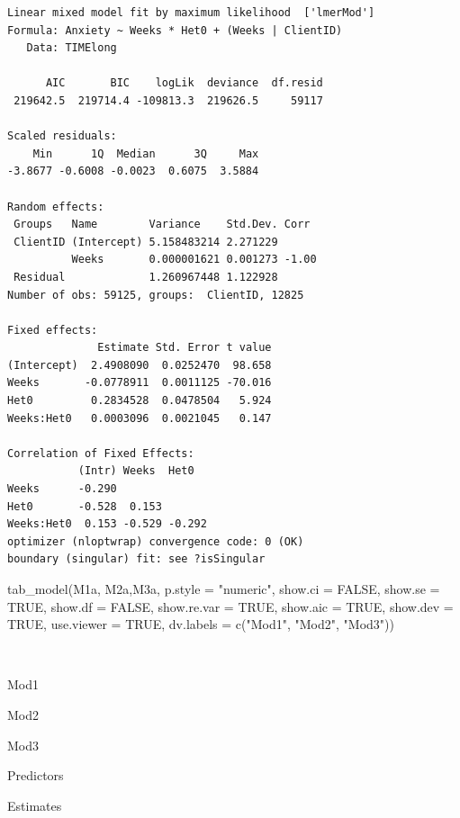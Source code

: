 \documentclass[
  11pt,
]{book}
\newenvironment{Shaded}{\begin{snugshade}}{\end{snugshade}}
\newcommand{\AttributeTok}[1]{\textcolor[rgb]{0.77,0.63,0.00}{#1}}
\newcommand{\ConstantTok}[1]{\textcolor[rgb]{0.00,0.00,0.00}{#1}}
\newcommand{\FunctionTok}[1]{\textcolor[rgb]{0.00,0.00,0.00}{#1}}
\newcommand{\NormalTok}[1]{#1}
\newcommand{\StringTok}[1]{\textcolor[rgb]{0.31,0.60,0.02}{#1}}
\begin{document}
\begin{verbatim}
Linear mixed model fit by maximum likelihood  ['lmerMod']
Formula: Anxiety ~ Weeks * Het0 + (Weeks | ClientID)
   Data: TIMElong

      AIC       BIC    logLik  deviance  df.resid 
 219642.5  219714.4 -109813.3  219626.5     59117 

Scaled residuals: 
    Min      1Q  Median      3Q     Max 
-3.8677 -0.6008 -0.0023  0.6075  3.5884 

Random effects:
 Groups   Name        Variance    Std.Dev. Corr 
 ClientID (Intercept) 5.158483214 2.271229      
          Weeks       0.000001621 0.001273 -1.00
 Residual             1.260967448 1.122928      
Number of obs: 59125, groups:  ClientID, 12825

Fixed effects:
              Estimate Std. Error t value
(Intercept)  2.4908090  0.0252470  98.658
Weeks       -0.0778911  0.0011125 -70.016
Het0         0.2834528  0.0478504   5.924
Weeks:Het0   0.0003096  0.0021045   0.147

Correlation of Fixed Effects:
           (Intr) Weeks  Het0  
Weeks      -0.290              
Het0       -0.528  0.153       
Weeks:Het0  0.153 -0.529 -0.292
optimizer (nloptwrap) convergence code: 0 (OK)
boundary (singular) fit: see ?isSingular
\end{verbatim}

\begin{Shaded}
\begin{Highlighting}[]
\FunctionTok{tab\_model}\NormalTok{(M1a, M2a,M3a, }\AttributeTok{p.style =} \StringTok{"numeric"}\NormalTok{, }\AttributeTok{show.ci =} \ConstantTok{FALSE}\NormalTok{, }\AttributeTok{show.se =} \ConstantTok{TRUE}\NormalTok{, }\AttributeTok{show.df =} \ConstantTok{FALSE}\NormalTok{, }\AttributeTok{show.re.var =} \ConstantTok{TRUE}\NormalTok{, }\AttributeTok{show.aic =} \ConstantTok{TRUE}\NormalTok{, }\AttributeTok{show.dev =} \ConstantTok{TRUE}\NormalTok{, }\AttributeTok{use.viewer =} \ConstantTok{TRUE}\NormalTok{, }\AttributeTok{dv.labels =} \FunctionTok{c}\NormalTok{(}\StringTok{"Mod1"}\NormalTok{, }\StringTok{"Mod2"}\NormalTok{, }\StringTok{"Mod3"}\NormalTok{))}
\end{Highlighting}
\end{Shaded}

~

Mod1

Mod2

Mod3

Predictors

Estimates
\end{document}

